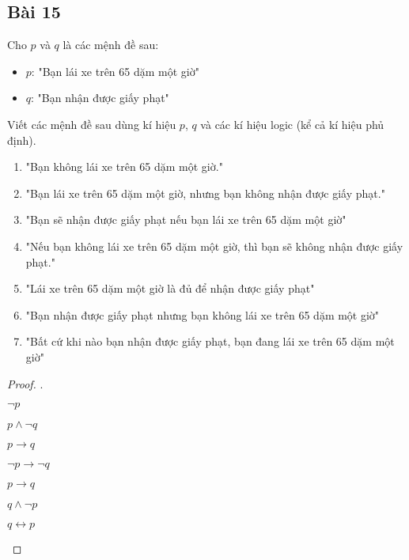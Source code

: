 \subsection*{Bài 15}
Cho $p$ và $q$ là các mệnh đề sau: \begin{itemize}
    \item $p$: "Bạn lái xe trên 65 dặm một giờ"
    \item $q$: "Bạn nhận được giấy phạt"
\end{itemize}
Viết các mệnh đề sau dùng kí hiệu $p$, $q$ và các kí hiệu logic (kể cả kí hiệu phủ định).
\begin{enumerate}[label=\alph*)]
    \item "Bạn không lái xe trên 65 dặm một giờ."
    \item "Bạn lái xe trên 65 dặm một giờ, nhưng bạn không nhận được giấy phạt."
    \item "Bạn sẽ nhận được giấy phạt nếu bạn lái xe trên 65 dặm một giờ"
    \item "Nếu bạn không lái xe trên 65 dặm một giờ, thì bạn sẽ không nhận được giấy phạt."
    \item "Lái xe trên 65 dặm một giờ là đủ để nhận được giấy phạt"
    \item "Bạn nhận được giấy phạt nhưng bạn không lái xe trên 65 dặm một giờ"
    \item "Bất cứ khi nào bạn nhận được giấy phạt, bạn đang lái xe trên 65 dặm một giờ"
\end{enumerate}
\begin{proof}.
    \begin{enumerate}[label=\alph*)]
        \begin{multicols}{3}
            \item $\neg p$
            \item $p\land \neg q$
            \item $p\rightarrow q$
            \item $\neg p\rightarrow \neg q$
            \item $p\rightarrow q$
            \item $q\land \neg p$
            \item $q\leftrightarrow p$
        \end{multicols}
    \end{enumerate}
\end{proof}
